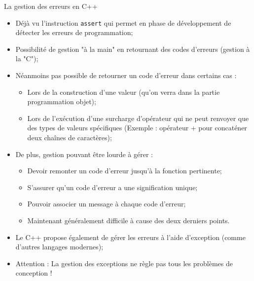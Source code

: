 \documentclass[compress,10pt,aspectratio=169]{beamer}
\begin{document}
\begin{frame}[fragile]{La gestion des erreurs en C++}
\scriptsize
  
\begin{itemize}
  \item Déjà vu l'instruction \texttt{assert} qui permet en phase de développement de détecter les erreurs de programmation;
  \item Possibilité de gestion "à la main" en retournant des codes d'erreurs (gestion à la "C");
  \item Néanmoins pas possible de retourner un code d'erreur dans certains cas :
  \begin{itemize}
  \scriptsize
  \item Lors de la construction d'une valeur (qu'on verra dans la partie programmation objet);
  \item Lors de l'exécution d'une surcharge d'opérateur qui ne peut renvoyer que des types de valeurs spécifiques (Exemple : opérateur +
  pour concaténer deux chaînes de caractères);
  \end{itemize}
  \item De plus, gestion pouvant être lourde à gérer :
  \begin{itemize}
  \scriptsize
  \item Devoir remonter un code d'erreur jusqu'à la fonction pertinente;
  \item S'assurer qu'un code d'erreur a une signification unique;
  \item Pouvoir associer un message à chaque code d'erreur;
  \item Maintenant généralement difficile à cause des deux derniers points.
  \end{itemize}
  \item Le C++ propose également de gérer les erreurs à l'aide d'exception (comme d'autres langages modernes);
  \item \alert{Attention} : La gestion des exceptions ne règle pas tous les problèmes de conception !
  \end{itemize}
  \end{frame}
  
\end{document}
